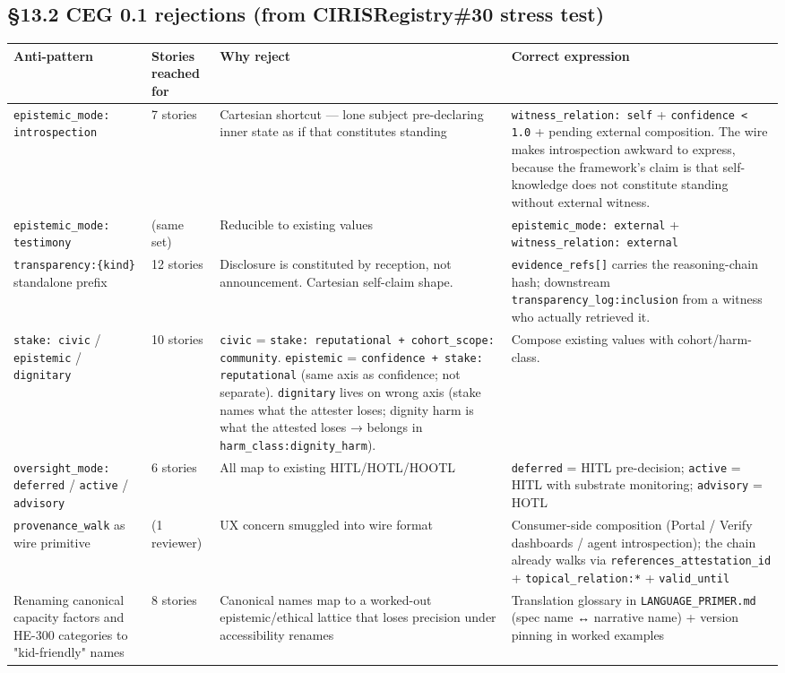 \documentclass[10pt]{article}
\begin{document}
\subsection*{§13.2 CEG 0.1 rejections (from CIRISRegistry\#30 stress test)}


{\scriptsize
\begin{longtable}{|p{4.0cm}|p{4.0cm}|p{4.0cm}|p{4.0cm}|}\hline
\textbf{Anti-pattern} & \textbf{Stories reached for} & \textbf{Why reject} & \textbf{Correct expression} \\ \hline\endhead
\texttt{epistemic\_mode: introspection} & 7 stories & Cartesian shortcut — lone subject pre-declaring inner state as if that constitutes standing & \texttt{witness\_relation: self} + \texttt{confidence < 1.0} + pending external composition. The wire makes introspection awkward to express, because the framework's claim is that self-knowledge does not constitute standing without external witness. \\ \hline
\texttt{epistemic\_mode: testimony} & (same set) & Reducible to existing values & \texttt{epistemic\_mode: external} + \texttt{witness\_relation: external} \\ \hline
\texttt{transparency:\{kind\}} standalone prefix & 12 stories & Disclosure is constituted by reception, not announcement. Cartesian self-claim shape. & \texttt{evidence\_refs[]} carries the reasoning-chain hash; downstream \texttt{transparency\_log:inclusion} from a witness who actually retrieved it. \\ \hline
\texttt{stake: civic} / \texttt{epistemic} / \texttt{dignitary} & 10 stories & \texttt{civic} = \texttt{stake: reputational + cohort\_scope: community}. \texttt{epistemic} = \texttt{confidence + stake: reputational} (same axis as confidence; not separate). \texttt{dignitary} lives on wrong axis (stake names what the attester loses; dignity harm is what the attested loses → belongs in \texttt{harm\_class:dignity\_harm}). & Compose existing values with cohort/harm-class. \\ \hline
\texttt{oversight\_mode: deferred} / \texttt{active} / \texttt{advisory} & 6 stories & All map to existing HITL/HOTL/HOOTL & \texttt{deferred} = HITL pre-decision; \texttt{active} = HITL with substrate monitoring; \texttt{advisory} = HOTL \\ \hline
\texttt{provenance\_walk} as wire primitive & (1 reviewer) & UX concern smuggled into wire format & Consumer-side composition (Portal / Verify dashboards / agent introspection); the chain already walks via \texttt{references\_attestation\_id} + \texttt{topical\_relation:*} + \texttt{valid\_until} \\ \hline
Renaming canonical capacity factors and HE-300 categories to "kid-friendly" names & 8 stories & Canonical names map to a worked-out epistemic/ethical lattice that loses precision under accessibility renames & Translation glossary in \texttt{LANGUAGE\_PRIMER.md} (spec name ↔ narrative name) + version pinning in worked examples \\ \hline
\end{longtable}}
\end{document}
